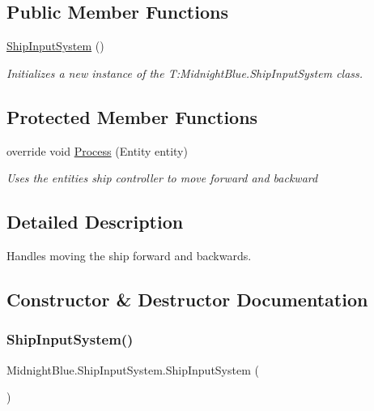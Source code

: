 \subsection*{Public Member Functions}
\begin{DoxyCompactItemize}
\item 
\hyperlink{class_midnight_blue_1_1_ship_input_system_ad7f804f91939a651c8e53ddb6bf55db6}{Ship\+Input\+System} ()
\begin{DoxyCompactList}\small\item\em Initializes a new instance of the T\+:\+Midnight\+Blue.\+Ship\+Input\+System class. \end{DoxyCompactList}\end{DoxyCompactItemize}
\subsection*{Protected Member Functions}
\begin{DoxyCompactItemize}
\item 
override void \hyperlink{class_midnight_blue_1_1_ship_input_system_ac504beb5b6afa47ca4618d9683e46946}{Process} (Entity entity)
\begin{DoxyCompactList}\small\item\em Uses the entities ship controller to move forward and backward \end{DoxyCompactList}\end{DoxyCompactItemize}


\subsection{Detailed Description}
Handles moving the ship forward and backwards. 



\subsection{Constructor \& Destructor Documentation}
\hypertarget{class_midnight_blue_1_1_ship_input_system_ad7f804f91939a651c8e53ddb6bf55db6}{}\label{class_midnight_blue_1_1_ship_input_system_ad7f804f91939a651c8e53ddb6bf55db6} 
\subsubsection{\texorpdfstring{Ship\+Input\+System()}{ShipInputSystem()}}
{\footnotesize\ttfamily Midnight\+Blue.\+Ship\+Input\+System.\+Ship\+Input\+System (\begin{DoxyParamCaption}{ }\end{DoxyParamCaption})\hspace{0.3cm}{\ttfamily [inline]}}



